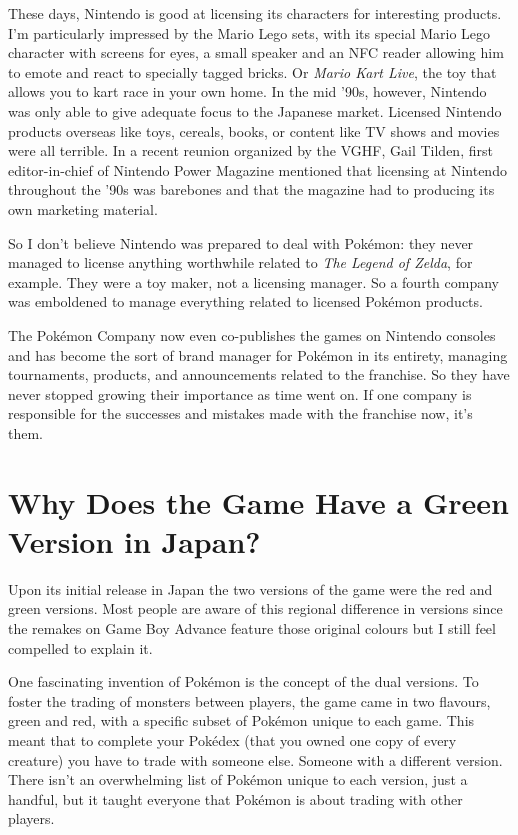 \documentclass{book}
\begin{document}
These days, Nintendo is good at licensing its characters for interesting products. I’m particularly impressed by the Mario Lego sets, with its special Mario Lego character with screens for eyes, a small speaker and an NFC reader allowing him to emote and react to specially tagged bricks. Or \emph{Mario Kart Live}, the toy that allows you to kart race in your own home. In the mid ’90s, however, Nintendo was only able to give adequate focus to the Japanese market. Licensed Nintendo products overseas like toys, cereals, books, or content like TV shows and movies were all terrible. In a recent reunion organized by the VGHF, Gail Tilden, first editor-in-chief of Nintendo Power Magazine mentioned that licensing at Nintendo throughout the ’90s was barebones and that the magazine had to producing its own marketing material.

So I don’t believe Nintendo was prepared to deal with Pokémon: they never managed to license anything worthwhile related to \emph{The Legend of Zelda}, for example. They were a toy maker, not a licensing manager. So a fourth company was emboldened to manage everything related to licensed Pokémon products.

The Pokémon Company now even co-publishes the games on Nintendo consoles and has become the sort of brand manager for Pokémon in its entirety, managing tournaments, products, and announcements related to the franchise. So they have never stopped growing their importance as time went on. If one company is responsible for the successes and mistakes made with the franchise now, it’s them.

\FloatBarrier\needspace{5pt}\section*{Why Does the Game Have a Green Version in Japan?}\nopagebreak[4]

Upon its initial release in Japan the two versions of the game were the red and green versions. Most people are aware of this regional difference in versions since the remakes on Game Boy Advance feature those original colours but I still feel compelled to explain it.

One fascinating invention of Pokémon is the concept of the dual versions. To foster the trading of monsters between players, the game came in two flavours, green and red, with a specific subset of Pokémon unique to each game. This meant that to complete your Pokédex (that you owned one copy of every creature) you have to trade with someone else. Someone with a different version. There isn’t an overwhelming list of Pokémon unique to each version, just a handful, but it taught everyone that Pokémon is about trading with other players.
\end{document}
